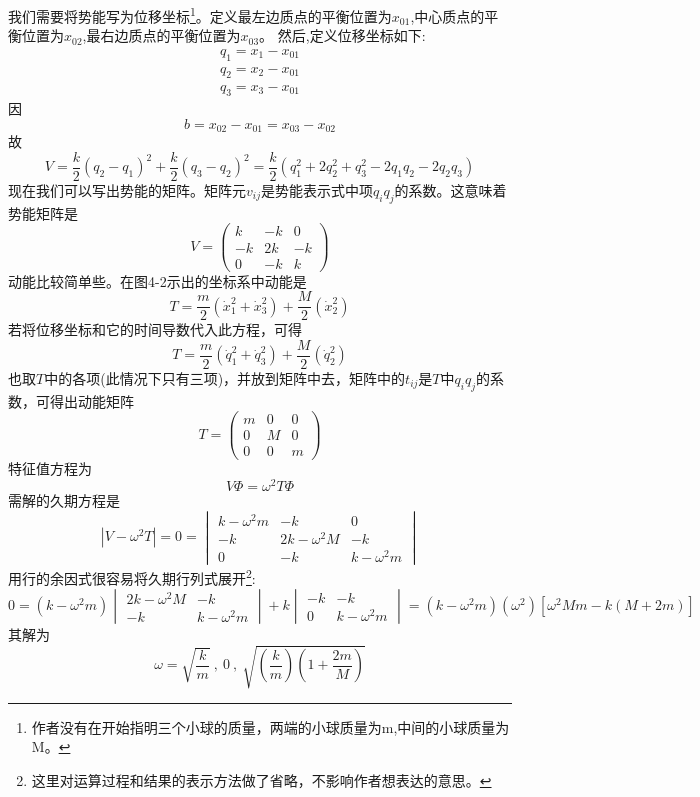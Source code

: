 我们需要将势能写为位移坐标\footnote{作者没有在开始指明三个小球的质量，两端的小球质量为m,中间的小球质量为M。}。定义最左边质点的平衡位置为$x_{01}$,中心质点的平衡位置为$x_{02}$,最右边质点的平衡位置为$x_{03}$。
然后,定义位移坐标如下:
\[ 
\begin{array}{c}
    q_1=x_1-x_{01} \\
    q_2=x_2-x_{01} \\
    q_3=x_3-x_{01}
\end{array}
\]
因
\[b=x_{02}-x_{01}=x_{03}-x_{02}\]
故
\[V=\frac{k}{2}(q_2-q_1)^2+\frac{k}{2}(q_3-q_2)^2=\frac{k}{2}(q_1^2+2q_2^2+q_3^2-2q_1q_2-2q_2q_3)\]
现在我们可以写出势能的矩阵。矩阵元$v_{ij}$是势能表示式中项$q_iq_j$的系数。这意味着势能矩阵是
\[V=
\begin{pmatrix}
    k & -k & 0 \\
    -k & 2k & -k \\
    0 & -k & k
\end{pmatrix}
\]
动能比较简单些。在图4-2示出的坐标系中动能是
\[T=\frac{m}{2}(\dot{x}_1^2+\dot{x}_3^2)+\frac{M}{2}(\dot{x}_2^2)\]
若将位移坐标和它的时间导数代入此方程，可得
\[T=\frac{m}{2}(\dot{q}_1^2+\dot{q}_3^2)+\frac{M}{2}(\dot{q}_2^2)\]
也取$T$中的各项(此情况下只有三项)，并放到矩阵中去，矩阵中的$t_{ij}$是$T$中$q_iq_j$的系数，可得出动能矩阵
\[T=
\begin{pmatrix}
    m & 0 & 0 \\
    0 & M & 0 \\
    0 & 0 & m
\end{pmatrix}
\]
特征值方程为
\[V\Phi=\omega^2T\Phi\]
需解的久期方程是
\[|V-\omega^2T|=0=
\begin{vmatrix}
    k-\omega^2m & -k & 0 \\
    -k & 2k-\omega^2M & -k \\
    0 & -k & k-\omega^2m
\end{vmatrix}
\]
用行的余因式很容易将久期行列式展开\footnote{这里对运算过程和结果的表示方法做了省略，不影响作者想表达的意思。}:
\[0=(k-\omega^2m)
\begin{vmatrix}
    2k-\omega^2M & -k \\
    -k & k-\omega^2m
\end{vmatrix}
+k
\begin{vmatrix}
    -k & -k \\
    0 & k-\omega^2m
\end{vmatrix}
=(k-\omega^2m)(\omega^2)[\omega^2Mm-k(M+2m)]
\]
其解为
\[\omega=\sqrt{\frac{k}{m}} \ ,\ 0 \ , \ \sqrt{\left(\frac{k}{m}\right)\left(1+\frac{2m}{M}\right)}\]

